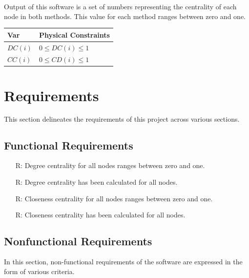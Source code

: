 \documentclass[12pt]{article}
\newcounter{reqnum} %
\begin{document}
\noindent
Output of this software is a set of numbers representing the centrality of each node in both methods. This value for each method ranges between zero and one.
\begin{table}[!h]
\caption{Output Variables} \label{TblOutputVar}
\renewcommand{\arraystretch}{1.2}
\noindent \begin{longtable*}{l l} 
  \toprule
  \textbf{Var} & \textbf{Physical Constraints} \\
  \midrule 
  $DC(i)$ & $ 0 \leq DC(i) \leq 1$
  \\
 $CC(i)$ & $ 0 \leq CD(i) \leq 1$
\\
  \bottomrule
\end{longtable*}
\end{table}


\section{Requirements}

This section delineates the requirements of this project across various sections.

\subsection{Functional Requirements}

\noindent \begin{itemize}

\item[R\refstepcounter{reqnum}\thereqnum \label{R_Inputs}:] Degree centrality for all nodes ranges between zero and one.
\item[R\refstepcounter{reqnum}\thereqnum \label{R_Calculate}:] Degree centrality has been calculated for all nodes.

\item[R\refstepcounter{reqnum}\thereqnum \label{R_VerifyOutput}:] Closeness centrality for all nodes ranges between zero and one.

\item[R\refstepcounter{reqnum}\thereqnum \label{R_Output}:] Closeness centrality has been calculated for all nodes.


\end{itemize}



\subsection{Nonfunctional Requirements}
In this section, non-functional requirements of the software are expressed in the form of various criteria.
\end{document}
